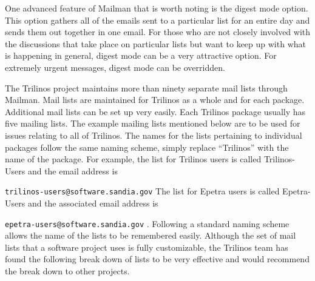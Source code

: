 \documentclass[12pt,relax]{article}
\newcommand{\InlineCommand}[1]{
  {\hspace{0.01 in}} {\tt #1} {\hspace{0.01 in}}}
\begin{document}
One advanced feature of Mailman that is worth noting is the digest mode option.
This option gathers all of the emails sent to a particular list for an entire 
day and sends them out together in one email.  For those who are not closely 
involved with the discussions that take place on particular lists but want to 
keep up with what is happening in general, digest mode can be a very 
attractive option.  For extremely urgent messages, digest mode can 
be overridden.

The Trilinos project maintains more than ninety separate mail lists through 
Mailman.  Mail lists are maintained for Trilinos as a whole and for each 
package.  Additional mail lists can be set up very easily.  Each Trilinos 
package usually has five mailing lists.  The example mailing lists mentioned 
below are to be used for issues relating to all of Trilinos.  
The names for the lists pertaining to individual packages follow the same 
naming scheme, simply replace ``Trilinos'' with the name of the package.  For example, the list for Trilinos users is 
called Trilinos-Users and the email address is 
\InlineCommand{trilinos-users@software.sandia.gov}  The list 
for Epetra users is called Epetra-Users and the associated email address is 
\InlineCommand{epetra-users@software.sandia.gov}.  Following a standard naming
scheme allows the name of the lists to be remembered easily.  Although the 
set of mail lists that a software project uses is fully customizable, the 
Trilinos team has found the following break down of lists to be very effective 
and would recommend the break down to other projects.

\end{document}
